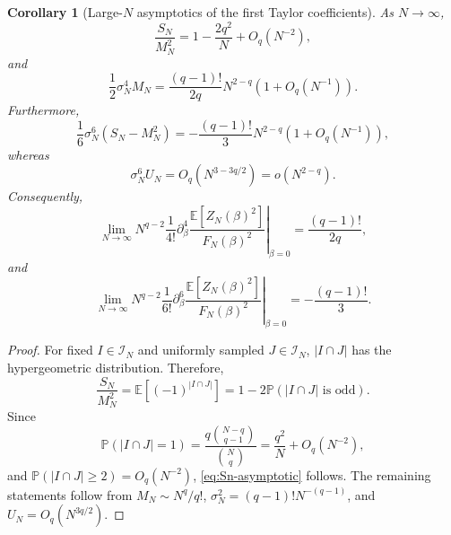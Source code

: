 \documentclass[11pt]{article}
\newtheorem{corollary}[theorem]{Corollary}
\newcommand{\E}{\mathbb{E}}
\newcommand{\calI}{\mathcal{I}}
\begin{document}
\begin{corollary}[Large-$N$ asymptotics of the first Taylor coefficients]
  \label{cor:Zn2-large-n-Taylor-coefficients}
  As $N\to\infty$,
  \begin{equation}\label{eq:Sn-asymptotic}
    \frac{S_N}{M_N^2}
    =
    1-\frac{2q^2}{N}+O_q(N^{-2}),
  \end{equation}
  and
  \begin{equation}\label{eq:Zn2-beta4-coefficient}
    \frac12\sigma_N^4M_N
    =
    \frac{(q-1)!}{2q}
    N^{2-q}
    \left(
      1+O_q(N^{-1})
    \right).
  \end{equation}
  Furthermore,
  \begin{equation}\label{eq:Zn2-beta6-second-chaos-coefficient}
    \frac16\sigma_N^6
    \left(
      S_N-M_N^2
    \right)
    =
    -\frac{(q-1)!}{3}
    N^{2-q}
    \left(
      1+O_q(N^{-1})
    \right),
  \end{equation}
  whereas
  \begin{equation}\label{eq:Zn2-beta6-third-chaos-coefficient}
    \sigma_N^6U_N
    =
    O_q\left(N^{3-3q/2}\right)
    =
    o\left(N^{2-q}\right).
  \end{equation}
  Consequently,
  \begin{equation}\label{eq:Zn2-fourth-derivative-limit}
    \lim_{N\to\infty}
    N^{q-2}\frac1{4!}
    \left.
      \partial_\beta^4
      \frac{\E[Z_N(\beta)^2]}{F_N(\beta)^2}
    \right|_{\beta=0}
    =
    \frac{(q-1)!}{2q},
  \end{equation}
  and
  \begin{equation}\label{eq:Zn2-sixth-derivative-limit}
    \lim_{N\to\infty}
    N^{q-2}\frac1{6!}
    \left.
      \partial_\beta^6
      \frac{\E[Z_N(\beta)^2]}{F_N(\beta)^2}
    \right|_{\beta=0}
    =
    -\frac{(q-1)!}{3}.
  \end{equation}
\end{corollary}

\begin{proof}
  For fixed $I\in\calI_N$ and uniformly sampled $J\in\calI_N$,
  $|I\cap J|$ has the hypergeometric distribution.  Therefore,
  \begin{equation}\label{eq:sign-hypergeometric}
    \frac{S_N}{M_N^2}
    =
    \E\left[(-1)^{|I\cap J|}\right]
    =
    1-2\mathbb P(|I\cap J|\text{ is odd}).
  \end{equation}
  Since
  \begin{equation}\label{eq:intersection-one-asymptotic}
    \mathbb P(|I\cap J|=1)
    =
    \frac{q\binom{N-q}{q-1}}{\binom Nq}
    =
    \frac{q^2}{N}+O_q(N^{-2}),
  \end{equation}
  and $\mathbb P(|I\cap J|\geq2)=O_q(N^{-2})$,
  \eqref{eq:Sn-asymptotic} follows.  The remaining statements follow from
  $M_N\sim N^q/q!$, $\sigma_N^2=(q-1)!N^{-(q-1)}$, and
  $U_N=O_q(N^{3q/2})$.
\end{proof}
\end{document}
